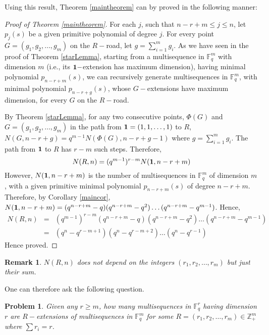 \documentclass[letterpaper, 12 pt]{article}  \usepackage{amssymb}
\newtheorem{remark}[theorem]{Remark}
\newtheorem{problem}{Problem}
\newcommand{\F}{\mathbb{F}}
\begin{document}
Using this result, Theorem \ref{maintheorem} can by proved in the following
manner:
\begin{proof}[Proof of Theorem \ref{maintheorem}]
 For each $j$, such that $n-r+m \leq j \leq n$, let $p_j(s)$ be a given
 primitive polynomial of degree $j$. For every point $G= (g_1,g_2,\ldots,g_m)$
on the $R-$road, let $g = \sum_{i=1}^mg_i$. As we have seen in the proof of
Theorem \ref{starLemma}, starting from a multisequence in $\F_q^m$ with
dimension
$m$ (i.e., its ${\bf 1}-$extension has maximum dimension), having minimal
polynomial $p_{n-r+m}(s)$, we can recursively generate multisequences in
$\F_q^m$, with minimal polynomial $p_{n-r+g}(s)$, whose $G-$extensions have
maximum dimension, for every $G$ on the $R-$road.

By Theorem \ref{starLemma}, for any two consecutive points, $\Phi(G)$ and $G =
(g_1,g_2,\ldots,g_m)$ in the path from ${\bf 1}=(1,1,\ldots,1)$ to $R$,
$N(G,{n-r+g}) = q^{m-1}N(\Phi(G),{n-r +g-1})$ where $g = \sum_{i=1}^mg_i$.
The path from ${\bf 1}$ to $R$ has $r-m$ such steps. Therefore,
\begin{equation}
 N(R,n) = (q^{m-1})^{r-m}N({\bf 1},{n-r+m})
\end{equation}
 However, $N({\bf 1},{n-r+m})$ is the number of multisequences in
$\F_q^m$ of dimension $m$, with a given primitive minimal polynomial $p_{n-r+m}(s)$ of degree
$n-r+m$.
Therefore, by Corollary \ref{maincor}, $ N({\bf 1},{n-r+m}) =
(q^{n-r+m}-q)(q^{n-r+m}-q^2)\ldots(q^{n-r+m}-q^{m-1})$. Hence,
\begin{eqnarray*}
 N(R,{n})&=&
(q^{m-1})^{r-m}(q^{n-r+m}-q)(q^{n-r+m}-q^2)\ldots(q^{n-r+m}-q^{m-1})\\
                           &=&  (q^n-q^{r-m+1})(q^n - q^{r-m+2})\ldots(q^n -
q^{r-1})
\end{eqnarray*}
Hence proved.
\end{proof}

\begin{remark}
 $N(R,{n})$ does not depend on the integers $(r_1,r_2,\ldots,r_m)$ but just
their sum.
\end{remark}
One can therefore ask the following question.

\begin{problem}
 Given any $r\geq m$, how many multisequences in $\F_q^r$ having dimension $r$
are $R-$extensions of multisequences in $\F_q^m$ for some $R
=(r_1,r_2,\ldots,r_m)\in \mathbb{Z}_+^m$ where $\sum r_i = r$. 
\end{problem}
\end{document}
